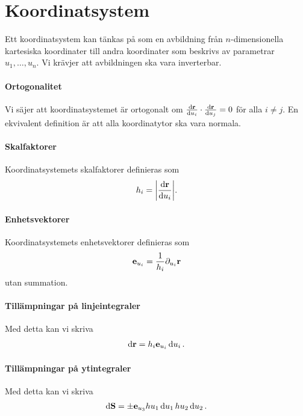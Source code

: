 \section{Koordinatsystem}

Ett koordinatsystem kan tänkas på som en avbildning från $n$-dimensionella kartesiska koordinater till andra koordinater som beskrivs av parametrar $u_1, \dots, u_n$. Vi krävjer att avbildningen ska vara inverterbar.

\paragraph{Ortogonalitet}
Vi säjer att koordinatsystemet är ortogonalt om $\dv{\vb{r}}{u_i}\cdot\dv{\vb{r}}{u_j} = 0$ för alla $i\neq j$. En ekvivalent definition är att alla koordinatytor ska vara normala.

\paragraph{Skalfaktorer}
Koordinatsystemets skalfaktorer definieras som
\begin{align*}
	h_i = \abs{\dv{\vb{r}}{u_i}}.
\end{align*}

\paragraph{Enhetsvektorer}
Koordinatsystemets enhetsvektorer definieras som
\begin{align*}
	\vb{e}_{u_i} = \frac{1}{h_i}\partial_{u_i}\vb{r}
\end{align*}
utan summation.

\paragraph{Tillämpningar på linjeintegraler}
Med detta kan vi skriva
\begin{align*}
	\dd{\vb{r}} = h_i\vb{e}_{u_i}\dd{u_i}.
\end{align*}

\paragraph{Tillämpningar på ytintegraler}
Med detta kan vi skriva
\begin{align*}
	\dd{\vb{S}} = \pm\vb{e}_{u_3}hu_{1}\dd{u_{1}}hu_{2}\dd{u_{2}}.
\end{align*}

